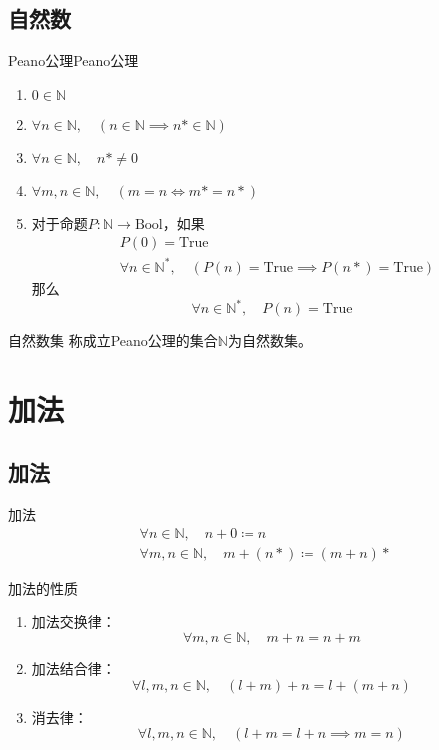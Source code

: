 \documentclass[lang = cn, scheme = chinese, thmcnt = section]{elegantbook}
\newcommand{\N}{\mathbb{N}}            %
\begin{document}
\subsection{自然数}

\begin{axiom}{Peano公理}{Peano公理}
	\begin{enumerate}
		\item $0\in\N$
		\item $\forall n\in\N,\quad (n\in\N\implies n*\in\N)$
		\item $\forall n\in\N,\quad n*\ne 0$
		\item $\forall m,n\in\N,\quad (m=n\iff m*=n*)$
		\item 对于命题$P:\N\to\text{Bool}$，如果
		\begin{align*}
			& P(0)=\text{True}\\
			& \forall n\in\N^*,\quad (P(n)=\text{True}\implies P(n*)=\text{True})
		\end{align*}
		那么
		$$
		\forall n\in\N^*,\quad P(n)=\text{True}
		$$
	\end{enumerate}
\end{axiom}

\begin{definition}{自然数集}
	称成立Peano公理的集合$\N$为自然数集。
\end{definition}

\section{加法}

\subsection{加法}

\begin{definition}{加法}
	\begin{align*}
		& \forall n\in\N,\quad n+0\coloneqq n\\
		& \forall m,n\in\N,\quad m+(n*)\coloneqq (m+n)*
	\end{align*}
\end{definition}

\begin{proposition}{加法的性质}
	\begin{enumerate}
		\item 加法交换律：
		$$
		\forall m,n\in\N,\quad m+n=n+m
		$$
		\item 加法结合律：
		$$
		\forall l,m,n\in\N,\quad (l+m)+n=l+(m+n)
		$$
		\item 消去律：
		$$
		\forall l,m,n\in\N,\quad (l+m=l+n\implies m=n)
		$$
	\end{enumerate}
\end{proposition}
\end{document}
